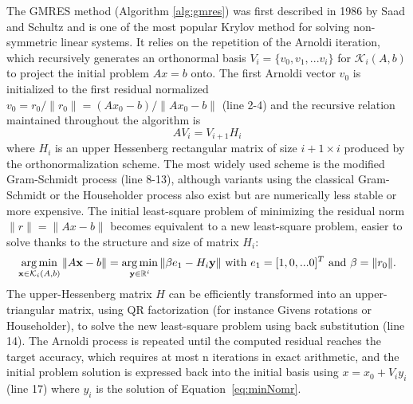 \documentclass[twoside]{article}
\DeclareMathOperator*{\argmin}{arg\,min}
\begin{document}
The GMRES method (Algorithm \ref{alg:gmres}) was first described in 1986 by Saad and Schultz \cite{gmres} and is one of the most popular Krylov method for solving non-symmetric linear systems. It relies on the repetition of the Arnoldi iteration, which recursively generates an orthonormal basis $V_i = \{v_0, v_1, ... v_{i}\}$ for $\mathcal{K}_i(A, b)$ to project the initial problem $A x = b$ onto. The first Arnoldi vector $v_0$ is initialized to the first residual normalized $v_0 = r_0/\|r_0\| = (A x_0 - b) / \|A x_0 - b\|$ (line 2-4) and the recursive relation maintained throughout the algorithm is $$AV_i = V_{i+1}H_i$$ where $H_i$ is an upper Hessenberg rectangular matrix of size $i+1 \times i$ produced by the orthonormalization scheme. The most widely used scheme is the modified Gram-Schmidt process (line 8-13), although variants using the classical Gram-Schmidt or the Householder process also exist but are numerically less stable or more expensive. The initial least-square problem of minimizing the residual norm $\|r\| = \|A x  - b\|$ becomes equivalent to a new least-square problem, easier to solve thanks to the structure and size of matrix $H_i$:
\begin{equation}\label{eq:minNomr}
  \argmin_{\mathbf{x} \in \mathcal{K}_i(A, b)} \|A \mathbf{x} - b\| = \argmin_{\mathbf{y}\in \Bbb{R}^i}\|\beta e_1 - H_{i} \mathbf{y}\| \text{ with } e_1 = [1, 0,...0]^T \text{ and } \beta = \|r_0\| \text{.}
\end{equation}
The upper-Hessenberg matrix $H$ can be efficiently transformed into an upper-triangular matrix, using QR factorization (for instance Givens rotations or Householder), to solve the new least-square problem using back substitution \cite{govl:96} (line 14). The Arnoldi process is repeated until the computed residual reaches the target accuracy, which requires at most n iterations in exact arithmetic, and the initial problem solution is expressed back into the initial basis using $x = x_0 + V_i y_i$ (line 17) where $y_i$ is the solution of Equation~\eqref{eq:minNomr}.
\end{document}

